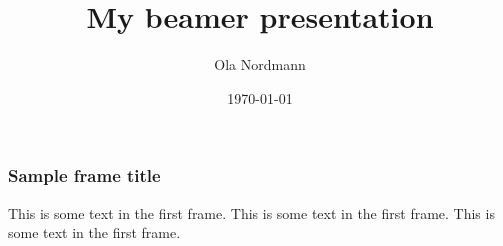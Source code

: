\documentclass[aspectratio=169]{beamer}
\title{My beamer presentation}
\author{Ola Nordmann}
\institute{University of Stackoverflow}
\date{\today}
\begin{document}
    \begin{frame}
        \titlepage
    \end{frame}

    \begin{frame}
        \frametitle{Sample frame title}

        This is some text in the first frame. This is some text in the first frame. This is some text in the first frame.
    \end{frame}

    \begin{frame}
        \nocite{*}
        
    \end{frame}
\end{document}
